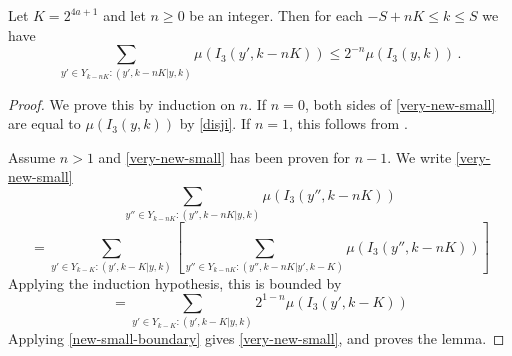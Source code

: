 \begin{lemma}
    \label{smaller-boundary}
    \leanok
    Let $K = 2^{4a+1}$
    and let $n\ge 0$ be an integer. Then
    for each $-S+nK\le k\le S$ we have
    \begin{equation}
            \label{very-new-small}
            \sum_{y'\in Y_{k-nK}: (y',k-nK|y,k)}\mu(I_3(y',k-nK)) \le 2^{-n} \mu(I_3(y,k))\,.
        \end{equation}
\end{lemma}
\begin{proof}
    \leanok
    We prove this by induction on $n$. If $n=0$,
    both sides of \eqref{very-new-small} are equal to
    $\mu(I_3(y,k))$ by \eqref{disji}. If $n=1$, this follows from .

    Assume $n>1$ and \eqref{very-new-small} has been proven for $n-1$.
    We write \eqref{very-new-small}
    \begin{equation}
        \sum_{y''\in Y_{k-nK}: (y'',k-nK|y,k)}\mu(I_3(y'',k-nK))
    \end{equation}
    \begin{equation}
        = \sum_{y'\in Y_{k-K}:(y',k-K|y,k)} \left[ \sum_{y''\in Y_{k-nK}: (y'',k-nK|y',k-K)}\mu(I_3(y'',k-nK)) \right]
    \end{equation}
    Applying the induction hypothesis, this is bounded by
    \begin{equation}
        = \sum_{y'\in Y_{k-K}:(y',k-K|y,k)} 2^{1-n}\mu(I_3(y',k-K))
    \end{equation}
    Applying \eqref{new-small-boundary} gives
    \eqref{very-new-small}, and proves the lemma.
\end{proof}

